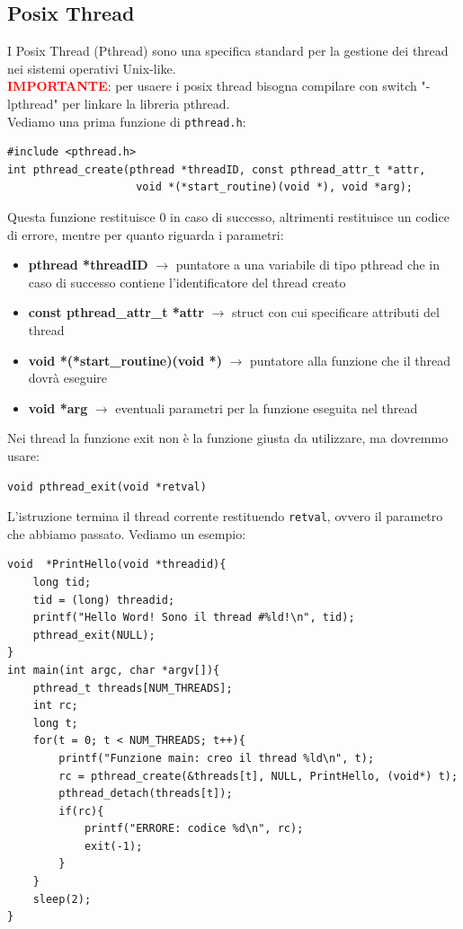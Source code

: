 \subsection{Posix Thread}
I Posix Thread (Pthread) sono una specifica standard per la gestione dei thread nei sistemi operativi Unix-like.\\
\textbf{\textcolor{red}{IMPORTANTE}}: per usaere i posix thread bisogna compilare con switch "-lpthread" per linkare la libreria pthread.\\
\noindent Vediamo una prima funzione di \texttt{pthread.h}:
\begin{verbatim}
#include <pthread.h>
int pthread_create(pthread *threadID, const pthread_attr_t *attr, 
                    void *(*start_routine)(void *), void *arg);
\end{verbatim}
Questa funzione restituisce 0 in caso di successo, altrimenti restituisce un codice di errore, mentre per quanto riguarda i parametri:
\begin{itemize}
    \item \textbf{pthread *threadID} $\rightarrow$ puntatore a una variabile di tipo pthread che in caso
    di successo contiene l'identificatore del thread creato
    \item \textbf{const pthread\_attr\_t *attr} $\rightarrow$ struct con cui specificare attributi del thread
    \item \textbf{void *(*start\_routine)(void *)} $\rightarrow$ puntatore alla funzione che il thread dovrà eseguire
    \item \textbf{void *arg} $\rightarrow$ eventuali parametri per la funzione eseguita nel thread
\end{itemize}
Nei thread la funzione exit non è la funzione giusta da utilizzare, ma dovremmo usare:
\begin{verbatim}
void pthread_exit(void *retval)
\end{verbatim}
L'istruzione termina il thread corrente restituendo \texttt{retval}, ovvero il parametro che abbiamo passato.
Vediamo un esempio:
\begin{verbatim}
void  *PrintHello(void *threadid){
    long tid;
    tid = (long) threadid;
    printf("Hello Word! Sono il thread #%ld!\n", tid);
    pthread_exit(NULL);
}
int main(int argc, char *argv[]){
    pthread_t threads[NUM_THREADS];
    int rc;
    long t;
    for(t = 0; t < NUM_THREADS; t++){
        printf("Funzione main: creo il thread %ld\n", t);
        rc = pthread_create(&threads[t], NULL, PrintHello, (void*) t);
        pthread_detach(threads[t]);
        if(rc){
            printf("ERRORE: codice %d\n", rc);
            exit(-1);
        }
    }
    sleep(2);
}
\end{verbatim}
